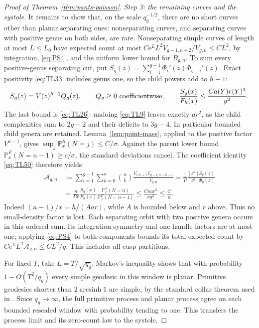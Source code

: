 \begin{proof}[Proof of Theorem~\ref{thm:pants-poisson}]
\emph{Step 3: the remaining curves and the systole.}
It remains to show that, on the scale $q_g^{-1/2}$, there are no short
curves other than planar separating ones: nonseparating curves, and
separating curves with positive genus on both sides, are rare.
Nonseparating simple curves of length at most $L\le L_0$ have expected
count at most $C\mathrm{e}^LL^2V_{g-1,n+2}/V_{g,n}\le CL^2$, by integration,
\eqref{eq:PS4}, and the uniform lower bound for $B_{g,n}$.
To sum every positive-genus separating cut, put
$S_g(z)=\sum_{i=1}^{g-1}\Phi_i'(z)\Phi_{g-i}'(z)$. Exact positivity
\eqref{eq:TL33} includes genus one, so the child powers add to $h-1$:
\begin{equation}
 S_g(z)=V(z)^{h-1}Q_g(z),\qquad Q_g\ge0
 \ \hbox{coefficientwise},\qquad
 \frac{S_g(x)}{F_h(x)}\le\frac{Ca(Y)r(Y)^2}{g^2}.
 \label{eq:FS2}
\end{equation}
The last bound is \eqref{eq:TL26}: undoing \eqref{eq:TL9} leaves
exactly $ar^2$, as the child complexities sum to $2g-2$ and their
deficits to $3g-4$. In particular bounded child genera are retained.
Lemma~\ref{lem:point-mass}, applied to the positive factor $V^{h-1}$,
gives $\sup_j\mathbb P_x^{S}(N=j)\le C/\sigma$. Against the parent lower
bound $\mathbb P_x^{F}(N=n-1)\ge c/\sigma$, the standard deviations
cancel. The coefficient identity \eqref{eq:TL50} therefore yields
\begin{equation}
 \begin{aligned}
 \mathcal A_{g,n}
 &:=\sum_{i=1}^{g-1}\sum_{k=0}^n\binom nk
       \frac{V_{i,k+1}V_{g-i,n-k+1}}{V_{g,n}}
   =\frac1P\frac{[z^n]S_g(z)}{[z^n]\Phi_g(z)}\\
 &=\frac{n}{Px}\frac{S_g(x)}{F_h(x)}
       \frac{\mathbb P_x^S(N=n)}{\mathbb P_x^F(N=n-1)}
   \le\frac{Cnar^2}{xg^2}\le\frac Cg.
 \end{aligned}
 \label{eq:FS3}
\end{equation}
Indeed $(n-1)/x=h/(Aar)$, while $A$ is bounded below and $r$ above.
Thus no small-density factor is lost. Each separating orbit with two
positive genera occurs in this ordered sum. Its integration symmetry
and one-handle factors are at most one; applying \eqref{eq:PS4} to
both components bounds its total expected count by
$C\mathrm{e}^LL^2\mathcal A_{g,n}\le CL^2/g$. This includes all cusp partitions.

For fixed $T$, take $L=T/\sqrt{q_g}$. Markov's inequality shows that
with probability $1-O(T^2/q_g)$ every simple geodesic in this window
is planar. Primitive geodesics shorter than $2\operatorname{arcsinh}1$
are simple, by the standard collar theorem used in
\cite[Section~1.1]{HTSphere}. Since $q_g\to\infty$, the full primitive
process and planar process agree on each bounded rescaled window
with probability tending to one. This transfers the process limit
and its zero-count law to the systole.


\end{proof}
